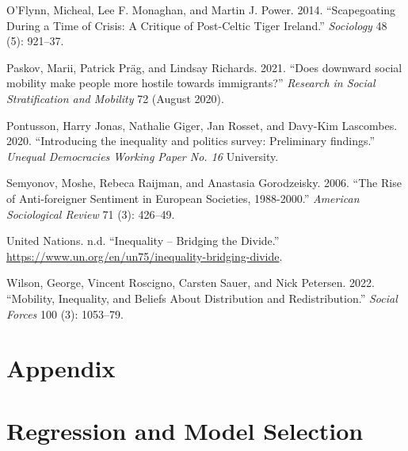 \documentclass[
  11pt,
]{article}
\newlength{\cslhangindent}
\newenvironment{CSLReferences}[2] %
 {%
  \setlength{\parindent}{0pt}
  \ifodd #1 \everypar{\setlength{\hangindent}{\cslhangindent}}\ignorespaces\fi
  \ifnum #2 > 0
  \setlength{\parskip}{#2\baselineskip}
  \fi
 }%
 {}
\begin{document}
\begin{CSLReferences}{1}{0}
\leavevmode{}%
O'Flynn, Micheal, Lee F. Monaghan, and Martin J. Power. 2014.
{``{Scapegoating During a Time of Crisis: A Critique of Post-Celtic
Tiger Ireland}.''} \emph{Sociology} 48 (5): 921--37.

\leavevmode{}%
Paskov, Marii, Patrick Präg, and Lindsay Richards. 2021. {``{Does
downward social mobility make people more hostile towards
immigrants?}''} \emph{Research in Social Stratification and Mobility} 72
(August 2020).

\leavevmode{}%
Pontusson, Harry Jonas, Nathalie Giger, Jan Rosset, and Davy-Kim
Lascombes. 2020. {``{Introducing the inequality and politics survey:
Preliminary findings}.''} \emph{Unequal Democracies Working Paper No.
16} University.

\leavevmode{}%
Semyonov, Moshe, Rebeca Raijman, and Anastasia Gorodzeisky. 2006.
{``{The Rise of Anti-foreigner Sentiment in European Societies,
1988-2000}.''} \emph{American Sociological Review} 71 (3): 426--49.

\leavevmode{}%
United Nations. n.d. {``{Inequality -- Bridging the Divide}.''}
\url{https://www.un.org/en/un75/inequality-bridging-divide}.

\leavevmode{}%
Wilson, George, Vincent Roscigno, Carsten Sauer, and Nick Petersen.
2022. {``{Mobility, Inequality, and Beliefs About Distribution and
Redistribution}.''} \emph{Social Forces} 100 (3): 1053--79.

\end{CSLReferences}

\newpage

\hypertarget{appendix}{%
\section*{Appendix}\label{appendix}}

\hypertarget{regression-and-model-selection}{%
\section{Regression and Model
Selection}\label{regression-and-model-selection}}
\end{document}
